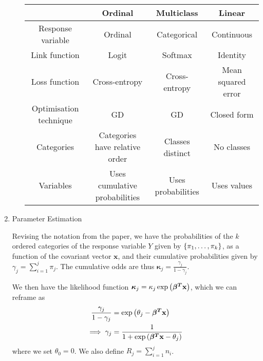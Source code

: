 \documentclass[reqno]{amsart}
\begin{document}
\begin{enumerate}[label=\textbf{(\Roman*)}]
\begin{enumerate}[label=\textbf{(\alph*)}]
           \begin{center}
             \begin{tabular}{|c|c|c|c|}
                \hline
                &Ordinal & Multiclass & Linear \\
                \hline
                Response variable & Ordinal & Categorical & Continuous \\
                Link function & Logit & Softmax & Identity \\
                Loss function & Cross-entropy & Cross-entropy & Mean squared error \\
                Optimisation technique & GD & GD & Closed form \\
                Categories & Categories have relative order & Classes distinct & No classes \\
                Variables & Uses cumulative probabilities & Uses probabilities & Uses values \\
                \hline
             \end{tabular}
           \end{center}
    
           
        \end{enumerate}
        \item \question Parameter Estimation
        
        \solution
    Revising the notation from the paper, we have the probabilities of the \(k\) ordered categories of the response variable \(Y\) given by \(\left\{\pi_1, \ldots, \pi_{k}\right\}\), as a function of the covariant vector \(\mathbf{x}\), and their cumulative probabilities given by \(\displaystyle \gamma_j = \sum_{i = 1}^{j} \pi_j\). The cumulative odds are thus \(\boldsymbol{\kappa}_j = \frac{\gamma_j}{1 - \gamma_j}\).

    We then have the likelihood function \(\boldsymbol{\kappa}_j = \kappa_j \exp \left(\boldsymbol{\beta^T}\mathbf{x}\right)\), which we can reframe as \begin{align}
        \begin{split}
            \frac{\gamma_j}{1 - \gamma_j} &= \exp \left(\theta_j - \boldsymbol{\beta^T}\mathbf{x}\right) \\
            \implies \gamma_{j} &= \frac{1}{1 + \exp \left(\boldsymbol{\beta^T}\mathbf{x} - \theta_j\right)} 
        \end{split}
    \end{align}
    where we set \(\theta_0 = 0\).
    We also define \(\displaystyle R_j = \sum_{i = 1}^{j} n_i\).


\end{enumerate}
\end{document}
